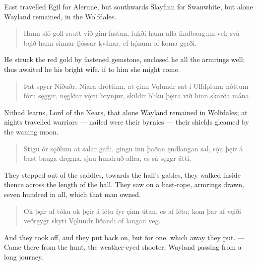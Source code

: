\bvb East travelled Egil for Alerune, but southwards Slayfinn for Swanwhite, but alone Wayland remained, in the Wolfdales. \\

\begin{verse}
\bva Hann sló goll rautt \hld við gim fastan,
lukði hann alla \hld lindbaugum vel;
svá bęið hann \hld sinnar ljóssar
kvánar, ef hǫ́num \hld of koma gęrði. \\%
\end{verse}

\bvb He struck the red gold by fastened gemstone, enclosed he all the armrings well; thus awaited he his bright wife, if to him she might come. \\

\begin{verse}
\bva Þat spyrr Níðuðr, \hld Níara dróttinn,
at ęinn Vǫlundr \hld sat í Ulfdǫlum;
nóttum fóru sęggir, \hld nęglðar vǫ́ru brynjur,
skildir bliku þęira \hld við hinn skarða mána. \\%
\end{verse}

\bvb Nithad learns, Lord of the Nears, that alone Wayland remained in Wolfdales; at nights travelled warriors — nailed were their byrnies — their shields gleamed by the waning moon. \\

\begin{verse}
\bva Stigu ór sǫðlum \hld at salar gafli,
gingu inn þaðan \hld ęndlangan sal,
sǫ́u þęir á bast \hld bauga dręgna,
sjau hundruð allra, \hld es sá sęggr átti. \\%
\end{verse}

\bvb They stepped out of the saddles, towards the hall’s gables, they walked inside thence across the length of the hall. They saw on a bast-rope, armrings drawn, seven hundred in all, which that man owned. \\

\begin{verse}
\bva Ok þęir af tóku \hld ok þęir á létu
fyr ęinn útan, \hld es af létu;
kom þar af vęiði \hld veðręygr skyti
Vǫlundr líðandi \hld of langan veg. \\%
\end{verse}

\bvb And they took off, and they put back on, but for one, which away they put. — Came there from the hunt, the weather-eyed shooter, Wayland passing from a long journey. \\

